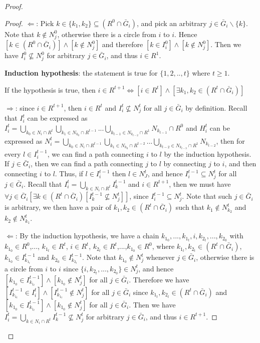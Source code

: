 \documentclass[12pt,letter]{article}
\theoremstyle{definition}
\theoremstyle{remark}
\theoremstyle{claim}
\begin{document}
\begin{proof}
\begin{proof}
$\Leftarrow$: Pick $k\in \{k_1,k_2\}\subseteq (R^0\cap \bar{G}_i)$, and pick an arbitrary $j\in \bar{G}_i\backslash \{k\}$. Note that $k\notin N^0_j$, otherwise there is a circle from $i$ to $i$. Hence $[k\in (R^0\cap \bar{G}_i)] \wedge [k\notin N^0_j]$ and therefore $[k\in I^0_i] \wedge [k\notin N^0_j]$. Then we have $I^0_i\nsubseteq N^0_j$ for arbitrary $j\in \bar{G}_i$, and thus $i\in R^1$.

\textbf{Induction hypothesis}: the statement is true for $\{1,2,..,t\}$ where $t\geq 1$. 


If the hypothesis is true, then $i\in R^{t+1}\Leftrightarrow [i\in R^{t}] \wedge [\exists k_1,k_2\in (R^{t}\cap \bar{G}_i)]$


$\Rightarrow$: since $i\in R^{t+1}$, then $i\in R^t$ and $I^t_i\nsubseteq N^t_j$ for all $j\in \bar{G}_i$ by definition. Recall that $I^t_i$ can be expressed as $I^{t}_i = \bigcup_{k_0\in N_i\cap R^{t}}\bigcup_{k_1\in N_{k_0}\cap R^{t-1}}...\bigcup_{k_{t-1}\in N_{k_{t-2}}\cap R^{1}}N_{k_{t-1}}\cap R^0$ and $H^t_i$ can be expressed as $N^t_i = \bigcup_{k_0\in N_i\cap R^{t-1}}\bigcup_{k_1\in N_{k_0}\cap R^{t-2}}...\bigcup_{k_{t-2}\in N_{k_{t-3}}\cap R^{1}}N_{k_{t-2}}$, then for every $l\in I^{t-1}_i$, we can find a path connecting $i$ to $l$ by the induction hypothesis. If $j\in \bar{G}_i$, then we can find a path connecting $j$ to $l$ by connecting $j$ to $i$, and then connecting $i$ to $l$. Thus, if $l\in I^{t-1}_i$ then $l\in N^t_J$, and hence $I^{t-1}_i\subseteq N^t_{j}$ for all $j\in \bar{G}_i$. Recall that $I^t_i = \bigcup_{k\in N_i\cap R^t}I^{t-1}_k$ and $i\in R^{t+1}$, then we must have $\forall j\in \bar{G}_i [\exists k\in (R^t\cap \bar{G}_i)[ I^{t-1}_k\nsubseteq N^t_j]]$, since $I^{t-1}_i\subseteq N^t_{j}$. Note that such $j\in \bar{G}_i$ is arbitrary,  we then have a pair of $k_1, k_2 \in (R^{t}\cap \bar{G}_i)$ such that $k_1\notin N^t_{k_2}$ and $k_2\notin N^t_{k_1}$.
\bigskip

$\Leftarrow$:
By the induction hypothesis, we have a chain $k_{1_0},...,k_{1_t},i,k_{2_t},...,k_{2_0}$ with $k_{1_0}\in R^0$,..., $k_{1_t}\in R^t$, $i\in R^t$, $k_{2_t}\in R^t$,...,$k_{1_0}\in R^0$, where $k_{1_t},k_{2_t}\in (R^{t}\cap \bar{G}_i)$, $k_{1_0}\in I^{t-1}_{k_{1_t}}$ and $k_{2_0}\in I^{t-1}_{k_{2_t}}$. Note that $k_{1_0}\notin N^t_j$ whenever $j\in \bar{G}_i$, otherwise there is a circle from $i$ to $i$ since $\{i,k_{2_t},...,k_{2_0}\}\in N^t_j$, and hence $[k_{1_0}\in I^{t-1}_{k_{1_t}}] \wedge [k_{1_0}\notin N^t_j]$ for all $j\in \bar{G}_i$. Therefore we have $[I^{t-1}_{k_{1_t}}\in I^t_i] \wedge [I^{t-1}_{k_{1_t}}\notin N^t_j]$ for all $j\in \bar{G}_i$ since $k_{1_t},k_{2_t}\in (R^{t}\cap \bar{G}_i)$ and $[k_{1_0}\in I^{t-1}_{k_{1_t}}] \wedge [k_{1_0}\notin N^t_j]$ for all $j\in \bar{G}_i$. Then we have $I^t_i=\bigcup_{k\in N_i\cap R^{t}}I^{t-1}_k\nsubseteq N^t_j$ for arbitrary $j\in \bar{G}_i$, and thus $i\in R^{t+1}$.




\end{proof}
\end{proof}
\end{document}

